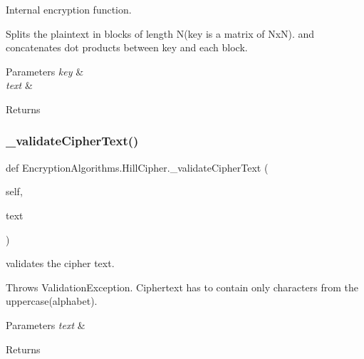 Internal encryption function. 

Splits the plaintext in blocks of length N(key is a matrix of Nx\+N). and concatenates dot products between key and each block.


\begin{DoxyParams}{Parameters}
{\em key} & \\
\hline
{\em text} & \\
\hline
\end{DoxyParams}
\begin{DoxyReturn}{Returns}

\end{DoxyReturn}
\mbox{\label{classEncryptionAlgorithms_1_1HillCipher_ada1350994864531981e9d6d67f64e99c}} 
\subsubsection{\texorpdfstring{\+\_\+validate\+Cipher\+Text()}{\_validateCipherText()}}
{\footnotesize\ttfamily def Encryption\+Algorithms.\+Hill\+Cipher.\+\_\+validate\+Cipher\+Text (\begin{DoxyParamCaption}\item[{}]{self,  }\item[{}]{text }\end{DoxyParamCaption})\hspace{0.3cm}{\ttfamily [private]}}



validates the cipher text. 

Throws Validation\+Exception. Ciphertext has to contain only characters from the uppercase(alphabet).


\begin{DoxyParams}{Parameters}
{\em text} & \\
\hline
\end{DoxyParams}
\begin{DoxyReturn}{Returns}

\end{DoxyReturn}
\mbox{\label{classEncryptionAlgorithms_1_1HillCipher_adcc154da68ea72b40661bbc12315604f}} 

